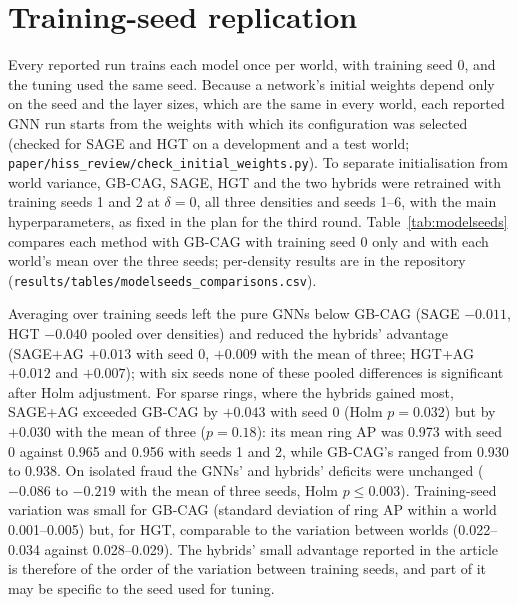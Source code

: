 \documentclass[pdflatex,sn-vancouver-num]{sn-jnl}
\begin{document}
\section{Training-seed replication}\label{sec:s_seeds}
Every reported run trains each model once per world, with training seed 0, and the tuning used the same seed.
Because a network's initial weights depend only on the seed and the layer sizes, which are the same in every
world, each reported GNN run starts from the weights with which its configuration was selected (checked for SAGE
and HGT on a development and a test world; \texttt{paper/hiss\_review/check\_initial\_weights.py}). To separate
initialisation from world variance, GB-CAG, SAGE, HGT and the two hybrids were retrained with training seeds 1 and 2
at $\delta=0$, all three densities and seeds 1--6, with the main hyperparameters, as fixed in the plan for the third
round. Table~\ref{tab:modelseeds} compares each method with GB-CAG with training seed 0 only and with each world's
mean over the three seeds; per-density results are in the repository
(\texttt{results/tables/modelseeds\_comparisons.csv}).

Averaging over training seeds left the pure GNNs below GB-CAG (SAGE $-0.011$, HGT $-0.040$ pooled over densities)
and reduced the hybrids' advantage (SAGE+AG $+0.013$ with seed 0, $+0.009$ with the mean of three; HGT+AG $+0.012$
and $+0.007$); with six seeds none of these pooled differences is significant after Holm adjustment. For sparse
rings, where the hybrids gained most, SAGE+AG exceeded GB-CAG by $+0.043$ with seed 0 (Holm $p=0.032$) but by
$+0.030$ with the mean of three ($p=0.18$): its mean ring AP was 0.973 with seed 0 against 0.965 and 0.956 with
seeds 1 and 2, while GB-CAG's ranged from 0.930 to 0.938. On isolated fraud the GNNs' and hybrids' deficits were
unchanged ($-0.086$ to $-0.219$ with the mean of three seeds, Holm $p\le0.003$). Training-seed variation was small
for GB-CAG (standard deviation of ring AP within a world 0.001--0.005) but, for HGT, comparable to the variation
between worlds (0.022--0.034 against 0.028--0.029). The hybrids' small advantage reported in the article is
therefore of the order of the variation between training seeds, and part of it may be specific to the seed used
for tuning.
\end{document}
